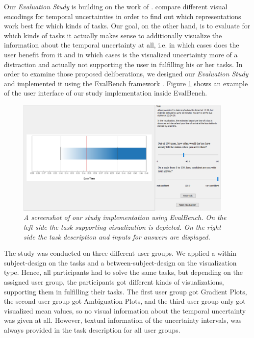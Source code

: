 Our \textit{Evaluation Study} is building on the work of \citet{gschwandtner2016visual}. \citet{gschwandtner2016visual} compare different visual encodings for temporal uncertainties in order to find out which representations work best for which kinds of tasks. Our goal, on the other hand, is to evaluate for which kinds of tasks it actually makes sense to additionally visualize the information about the temporal uncertainty at all, i.e. in which cases does the user benefit from it and in which cases is the visualized uncertainty more of a distraction and actually not supporting the user in fulfilling his or her tasks. In order to examine those proposed deliberations, we designed our \textit{Evaluation Study} and implemented it using the EvalBench framework \cite{aigner2013evalbench}. Figure \ref{fig:EvalBench_GUI} shows an example of the user interface of our study implementation inside EvalBench. \par \medskip

\begin{figure}[H]
	\centering
	\includegraphics[width=0.95\textwidth]{figures/EvalBench_GUI.png}
	\caption{\textit{A screenshot of our study implementation using EvalBench. On the left side the task supporting visualization is depicted. On the right side the task description and inputs for answers are displayed.}}
	\label{fig:EvalBench_GUI}
\end{figure}

The study was conducted on three different user groups. We applied a within-subject-design on the tasks and a between-subject-design on the visualization type. Hence, all participants had to solve the same tasks, but depending on the assigned user group, the participants got different kinds of visualizations, supporting them in fulfilling their tasks. The first user group got Gradient Plots, the second user group got Ambiguation Plots, and the third user group only got visualized mean values, so no visual information about the temporal uncertainty was given at all. However, textual information of the uncertainty intervals, was always provided in the task description for all user groups. \par \medskip

